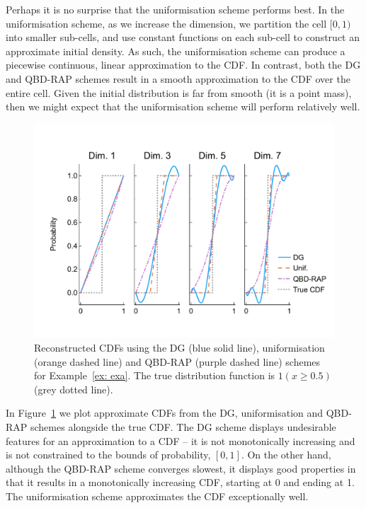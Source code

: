\begin{example}
Perhaps it is no surprise that the uniformisation scheme performs best. In the uniformisation scheme, as we increase the dimension, we partition the cell \([0,1)\) into smaller sub-cells, and use constant functions on each sub-cell to construct an approximate initial density. As such, the uniformisation scheme can produce a piecewise continuous, linear approximation to the CDF. In contrast, both the DG and QBD-RAP schemes result in a smooth approximation to the CDF over the entire cell. Given the initial distribution is far from smooth (it is a point mass), then we might expect that the uniformisation scheme will perform relatively well. 

\begin{figure}[h]
	\centering
	\includegraphics[width=\textwidth,trim={0cm 1.25cm 0cm 1.25cm},clip]{chapter6/figs/comp/fun1/cdfs_formatted.pdf}
	\caption{Reconstructed CDFs using the DG (blue solid line), uniformisation (orange dashed line) and QBD-RAP (purple dashed line) schemes for Example~\ref{ex: exa}. The true distribution function is \(1(x\geq 0.5)\) (grey dotted line).}
	\label{fig: pdf comp fun 1}
\end{figure} 
In Figure~\ref{fig: pdf comp fun 1} we plot approximate CDFs from the DG, uniformisation and QBD-RAP schemes alongside the true CDF. The DG scheme displays undesirable features for an approximation to a CDF -- it is not monotonically increasing and is not constrained to the bounds of probability, \([0,1]\). On the other hand, although the QBD-RAP scheme converges slowest, it displays good properties in that it results in a monotonically increasing CDF, starting at 0 and ending at 1. The uniformisation scheme approximates the CDF exceptionally well.
\end{example}

